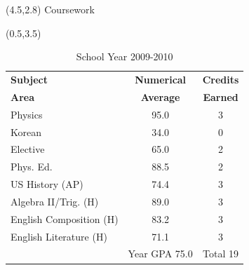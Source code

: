 \documentclass [] {report}
\begin{document}




\begin{textblock}{10}(4.5,2.8)
{\huge Coursework}
\end{textblock}

\begin{textblock}{5}(0.5,3.5)
\begin{table}
\caption{School Year 2009-2010}
\centering
\begin{tabularx}{\textwidth}{ X c c }
\toprule
{\bf Subject} & \multicolumn{1}{c}{\bf Numerical} & {\bf Credits} \\
{\bf Area}& \multicolumn{1}{c}{\bf Average} & {\bf Earned} \\
\midrule
Physics & 95.0 & 3 \\
Korean & 34.0 &  0 \\
Elective\footnotemark[2] & 65.0 & 2 \\
Phys. Ed. & 88.5 & 2 \\
US History (AP) & 74.4 & 3 \\
Algebra II/Trig. (H) & 89.0 & 3\\
English Composition (H) & 83.2 & 3 \\
English Literature (H) & 71.1 & 3 \\
\midrule
 & Year GPA 75.0 &  Total 19 \\
\bottomrule
\end{tabularx}
\end{table}
\end{textblock}
\end{document}
